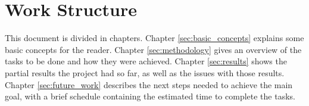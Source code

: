 \section*{Work Structure}

This document is divided in chapters. Chapter \ref{sec:basic_concepts} explains some basic concepts for the reader. Chapter \ref{sec:methodology} gives an overview of the tasks to be done and how they were achieved. Chapter \ref{sec:results} shows the partial results the project had so far, as well as the issues with those results. Chapter \ref{sec:future_work} describes the next steps needed to achieve the main goal, with a brief schedule containing the estimated time to complete the tasks.
